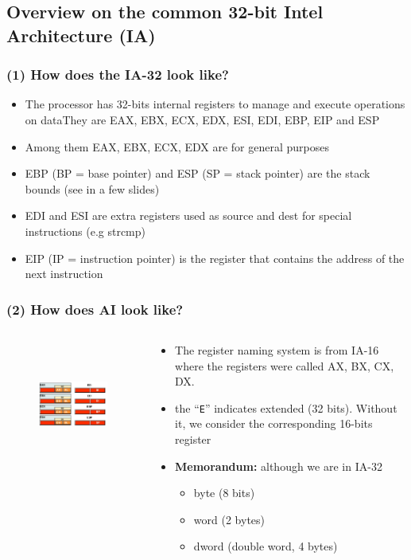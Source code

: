 \documentclass[]{beamer}
\begin{document}
\subsection{Overview on the common 32-bit Intel Architecture (IA)}
\begin{frame}
  \frametitle{(1) How does the IA-32 look like?}
  \begin{itemize}
  \item{The processor has 32-bits internal registers to manage and execute operations on data\newline They are EAX, EBX, ECX, EDX, ESI, EDI, EBP, EIP and ESP }
  \item{Among them EAX, EBX, ECX, EDX are for general purposes}
  \item{EBP (BP = base pointer) and ESP (SP = stack pointer) are the stack bounds (see in a few slides)}
  \item{EDI and ESI are extra registers used as source and dest for special instructions (e.g strcmp)}
  \item{EIP (IP = instruction pointer) is the register that contains the address of the next instruction}
  \end{itemize}
\end{frame}
\begin{frame}
  \frametitle{(2) How does AI look like?}
  \begin{columns}
    \begin{column}{2.5in}
      \begin{figure}
        \includegraphics[height=1.6in]{images/registers.jpeg}
        \label{Registers Division}
      \end{figure}
    \end{column}
    \begin{column}{2.5in}
      \begin{itemize}
      \item The register naming system is from IA-16 where the
        registers were called AX, BX, CX, DX.
      \item the ``\texttt{E}'' indicates extended (32 bits). Without
        it, we consider the corresponding 16-bits register
      \item \textbf{Memorandum:} although we are in IA-32
        \begin{itemize}
        \item byte (8 bits)
        \item word (2 bytes)
        \item dword (double word, 4 bytes)
        \end{itemize}
      \end{itemize}
    \end{column}
  \end{columns}
\end{frame}
\end{document}
